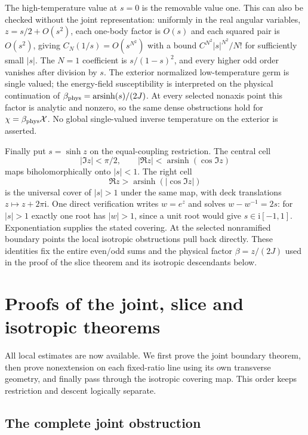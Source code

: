 \documentclass[11pt]{article}
\numberwithin{equation}{section}
\theoremstyle{definition}
\newcommand{\ii}{\mathrm i}
\begin{document}
The high-temperature value at $s=0$ is the removable value one.
This can also be checked
without the joint representation: uniformly in the real angular
variables, $z=s/2+O(s^2)$, each one-body factor is $O(s)$ and each
squared pair is $O(s^2)$, giving $C_N(1/s)=O(s^{N^2})$ with a
bound $C^{N^2}|s|^{N^2}/N!$ for sufficiently small $|s|$.
The $N=1$ coefficient is $s/(1-s)^2$, and every higher odd order
vanishes after division by $s$. The exterior normalized
low-temperature germ is single valued; the energy-field susceptibility
is interpreted on the physical continuation of
$\beta_{\rm phys}=\operatorname{arsinh}(s)/(2J)$.
At every selected nonaxis point this factor is analytic and nonzero,
so the same dense obstructions hold for $\chi=\beta_{\rm phys}\mathcal X$.
No global single-valued inverse temperature on the exterior is asserted.

Finally put $s=\sinh z$ on the equal-coupling restriction.
The central cell
\[
 |\Im z|<\pi/2,\qquad
 |\Re z|<\operatorname{arsinh}(\cos\Im z)
\]
maps biholomorphically onto $|s|<1$. The right cell
\[
 \Re z>\operatorname{arsinh}(|\cos\Im z|)
\]
is the universal cover of $|s|>1$ under the same map, with deck
translations $z\mapsto z+2\pi\ii$.
One direct verification writes $w=e^z$ and solves $w-w^{-1}=2s$:
for $|s|>1$ exactly one root has $|w|>1$, since a unit root would give
$s\in\ii[-1,1]$. Exponentiation supplies the stated covering.
At the selected nonramified boundary points the local isotropic
obstructions pull back directly. These identities fix the entire
even/odd sums and the physical factor $\beta=z/(2J)$ used in the
proof of the slice theorem and its isotropic descendants below.

\section{Proofs of the joint, slice and isotropic theorems}
\label{main:closure}

All local estimates are now available. We first prove the joint
boundary theorem, then prove nonextension on each fixed-ratio line
using its own transverse geometry, and finally pass through the
isotropic covering map. This order keeps restriction and descent
logically separate.

\subsection{The complete joint obstruction}
\end{document}
